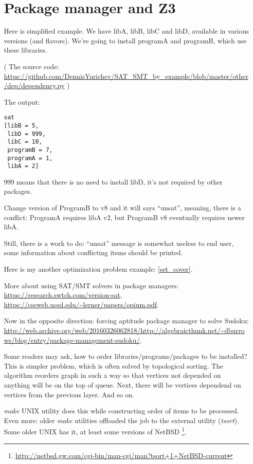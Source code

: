 \section{Package manager and Z3}

Here is simplified example.
We have libA, libB, libC and libD, available in various versions (and flavors).
We're going to install programA and programB, which use these libraries.



( The source code: \url{https://github.com/DennisYurichev/SAT_SMT_by_example/blob/master/other/dep/dependency.py} )

The output:

\begin{lstlisting}
sat
[libB = 5,
 libD = 999,
 libC = 10,
 programB = 7,
 programA = 1,
 libA = 2]
\end{lstlisting}

999 means that there is no need to install libD, it's not required by other packages.

Change version of ProgramB to v8 and it will says ``unsat'', meaning, there is a conflict:
ProgramA requires libA v2, but ProgramB v8 eventually requires newer libA.

Still, there is a work to do: ``unsat'' message is somewhat useless to end user,
some information about conflicting items should be printed.

Here is my another optimization problem example: \ref{set_cover}.

More about using SAT/SMT solvers in package managers: \url{https://research.swtch.com/version-sat},
\url{https://cseweb.ucsd.edu/~lerner/papers/opium.pdf}.

Now in the opposite direction: forcing aptitude package manager to solve Sudoku: \\
\url{http://web.archive.org/web/20160326062818/http://algebraicthunk.net/~dburrows/blog/entry/package-management-sudoku/}.

Some readers may ask, how to order libraries/programs/packages to be installed?
This is simpler problem, which is often solved by topological sorting.
The algorithm reorders graph in such a way so that vertices not depended on anything will be on the top of queue.
Next, there will be vertices dependend on vertices from the previous layer.
And so on.

\textit{make} UNIX utility does this while constructing order of items to be processed.
Even more: older \textit{make} utilities offloaded the job to the external utility (\textit{tsort}).
Some older UNIX has it, at least some versions of NetBSD
\footnote{\url{http://netbsd.gw.com/cgi-bin/man-cgi/man?tsort+1+NetBSD-current}}.

